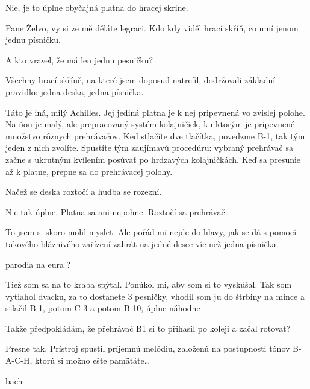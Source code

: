\documentclass[12pt]{article}
\begin{document}
\begin{description}[itemsep=0pt]
\item[Ž:] Nie, je to úplne obyčajná platna do hracej skrine.

\item[A:] Pane Želvo, vy si ze mě děláte legraci. Kdo kdy viděl hrací
    skříň, co umí jenom jednu písničku.

\item[Ž:] A kto vravel, že má len jednu pesničku?

\item[A:] Všechny hrací skříně, na které jsem doposud natrefil, dodržovali základní
    pravidlo: jedna deska, jedna písnička.

\item[Ž:] Táto je iná, milý Achilles. Jej jediná platna je k nej pripevnená vo 
    zvislej polohe. Na ňou je malý, ale prepracovaný systém koľajničiek, ku ktorým 
    je pripevnené množstvo rôznych prehrávačov. Keď stlačíte dve tlačítka, povedzme 
    B-1, tak tým jeden z nich zvolíte. Spustíte tým zaujímavú procedúru: vybraný 
    prehrávač sa začne s ukrutným kvílením posúvať po hrdzavých kolajničkách. Keď 
    sa presunie až k platne, prepne sa do prehrávacej polohy.

\item[A:] Načež se deska roztočí a hudba se rozezní.

\item[Ž:] Nie tak úplne. Platna sa ani nepohne. Roztočí sa prehrávač.

\item[A:] To jsem si skoro mohl myslet. Ale pořád mi nejde do hlavy, jak
    se dá s pomocí takového bláznivého zařízení zahrát na jedné desce víc než
    jedna písnička.

\item[TODO] parodia na eura ?

\item[Ž:] Tiež som sa na to kraba spýtal. Ponúkol mi, aby som si to vyskúšal. 
    Tak som vytiahol dvacku, za to dostanete 3 pesničky, vhodil som ju do štrbiny 
    na mince a stlačil B-1, potom C-3 a potom B-10, úplne náhodne

\item[A:] Takže předpokládám, že přehrávač B1 si to přihasil po koleji
    a začal rotovat?

\item[Ž:] Presne tak. Prístroj spustil príjemnú melódiu, založenú na postupnosti 
    tónov B-A-C-H, ktorú si možno ešte pamätáte\dots
    
\item[melodia] bach


\end{description}
\end{document}
